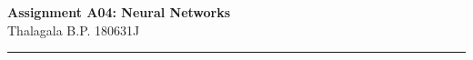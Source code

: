\documentclass[a4paper,11pt]{article}%
\begin{document}
	\begin{center}
	{\large \textbf{Assignment A04: Neural Networks}}\\
	Thalagala B.P.\hspace{0.5cm} 180631J 
\end{center}
\hrule


%
%
\end{document}
